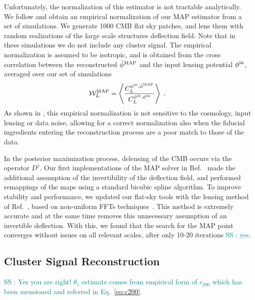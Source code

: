 \documentclass[prd, superscriptaddress, tightenlines, longbibliography, nofootinbib, eqsecnum, amsfonts, amsmath, floatfix, twocolumn, notitlepage]{revtex4-2}
\newcommand{\JC}[1]{\color{purple}{{JC:#1}}\color{black}\xspace}
\newcommand{\LL}[1]{{\color{orange}{LL: #1}}}
\newcommand{\bb}[1]{\textcolor{teal}{SS : #1}}
\begin{document}
Unfortunately, the normalization of this estimator is not tractable analytically. We follow \cite{Legrand:2021qdu,Legrand:2023jne} and obtain an empirical normalization of our MAP estimator from a set of simulations.
We generate 1000 CMB flat sky patches, and lens them with random realizations of the large scale structures deflection field. Note that in these simulations we do not include any cluster signal. The empirical normalization is assumed to be isotropic, and is obtained from the cross correlation between the reconstructed $\hat \phi^{\rm MAP}$ and the input lensing potential $\phi^{\rm in}$, averaged over our set of simulations
\begin{equation}
    \mathcal{W}^{\rm MAP}_L = \left< \frac{C_L^{\phi^{\rm in}, \hat \phi^{\rm MAP}}}{C_L^{\phi^{\rm in}, \phi^{\rm in}}} \right> \; .
\end{equation}
As shown in \cite{Legrand:2021qdu,Legrand:2023jne}, this empirical normalization is not sensitive to the cosmology, input lensing or data noise, allowing for a correct normalization also when the fiducial ingredients entering the reconstruction process are a poor match to those of the data.


In the posterior maximization process, delensing of the CMB occurs via the operator $D^\dagger$. Our first implementations of the MAP solver in Ref.~\cite{Carron:2017mqf} made the additional assumption of the invertibility of the deflection field, and performed remappings of the maps using a standard bicubic spline algorithm. To improve stability and performance, we updated our flat-sky tools with the lensing method of Ref.~\cite{Reinecke:2023gtp}, based on non-uniform FFTs techniques~\cite{Barnett2019, Barnett2020}. This method is extremely accurate and at the same time removes this unnecessary assumption of an invertible deflection. With this, we found that the search for the MAP point converges without issues on all relevant scales, after only 10-20 iterations\JC{is that right ?} \bb{yes}.


\subsection{Cluster Signal Reconstruction}
\label{sec:cluster_mass}
\LL{Should add a comment that to have the template kt we first need an estimate of the angular size of the cluster $\theta_s$ (which can be obtained from SZ effect like in Zubeldia paper, or else)}
\bb{Yes you are right! $\theta_s$ estimate comes from empirical form of $c_{200}$ which has been mensioned and referred in Eq.~\ref{eq:c200}.} \LL{But we dont know M200 before, so how do we get the template in the first place?}
\end{document}
